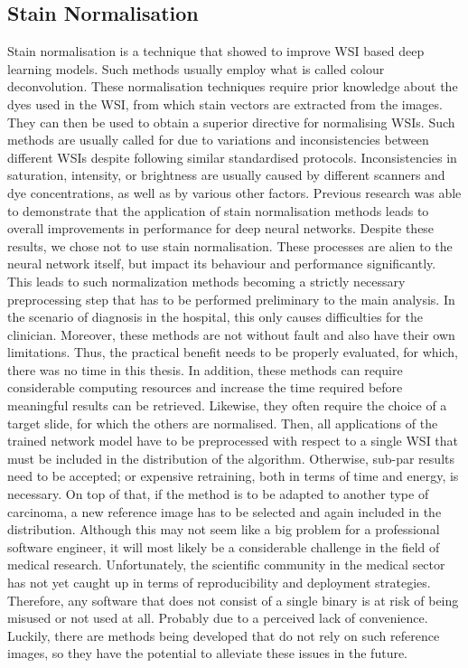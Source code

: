 \subsection{Stain Normalisation}

Stain normalisation is a technique that showed to improve WSI based deep learning models.
Such methods usually employ what is called colour deconvolution. These normalisation techniques require prior knowledge about the dyes used in the WSI, from which stain vectors are extracted from the images. They can then be used to obtain a superior directive for normalising WSIs. Such methods are usually called for due to variations and inconsistencies between different WSIs despite following similar standardised protocols. Inconsistencies in saturation, intensity, or brightness are usually caused by different scanners and dye concentrations, as well as by various other factors. \cite{GutierrezPerez2022StainCUT} Previous research was able to demonstrate that the application of stain normalisation methods leads to overall improvements in performance for deep neural networks. 
 \cite{Howard2021impact, Ciompi2017importance, Bejnordi2016Stain}
Despite these results, we chose not to use stain normalisation. These processes are alien to the neural network itself, but impact its behaviour and performance significantly. This leads to such normalization methods becoming a strictly necessary preprocessing step that has to be performed preliminary to the main analysis. In the scenario of diagnosis in the hospital, this only causes difficulties for the clinician.  Moreover, these methods are not without fault and also have their own limitations. \cite{Bejnordi2016Stain, Landini2021Colour} Thus, the practical benefit needs to be properly evaluated, for which, there was no time in this thesis.
In addition, these methods can require considerable computing resources and increase the time required before meaningful results can be retrieved. \cite{GutierrezPerez2022StainCUT} Likewise, they often require the choice of a target slide, for which the others are normalised. \cite{Reinhard2001Color, Macenko2009method} Then, all applications of the trained network model have to be preprocessed with respect to a single WSI that must be included in the distribution of the algorithm. Otherwise, sub-par results need to be accepted; or expensive retraining, both in terms of time and energy, is necessary. On top of that, if the method is to be adapted to another type of carcinoma, a new reference image has to be selected and again included in the distribution. Although this may not seem like a big problem for a professional software engineer, it will most likely be a considerable challenge in the field of medical research. Unfortunately, the scientific community in the medical sector has not yet caught up in terms of reproducibility and deployment strategies. Therefore, any software that does not consist of a single binary is at risk of being misused or not used at all. Probably due to a perceived lack of convenience. Luckily, there are methods being developed that do not rely on such reference images, so they have the potential to alleviate these issues in the future. \cite{GutierrezPerez2022StainCUT} 
